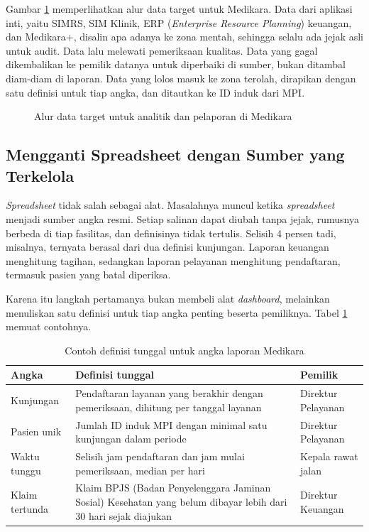 Gambar \ref{fig:ch09-alur-data-analitik} memperlihatkan alur data target
untuk Medikara. Data dari aplikasi inti, yaitu SIMRS, SIM Klinik, ERP
(\textit{Enterprise Resource Planning}) keuangan, dan Medikara+, disalin apa
adanya ke zona mentah,
sehingga selalu ada jejak asli untuk audit. Data lalu melewati pemeriksaan
kualitas. Data yang gagal dikembalikan ke pemilik datanya untuk diperbaiki di
sumber, bukan ditambal diam-diam di laporan. Data yang lolos masuk ke zona
terolah, dirapikan dengan satu definisi untuk tiap angka, dan ditautkan ke ID
induk dari MPI.

\begin{figure}[!htb]
  \centering
  
  \caption{Alur data target untuk analitik dan pelaporan di Medikara}
  \label{fig:ch09-alur-data-analitik}
\end{figure}

\subsection*{Mengganti Spreadsheet dengan Sumber yang Terkelola}

\textit{Spreadsheet} tidak salah sebagai alat. Masalahnya muncul ketika \textit{spreadsheet}
menjadi sumber angka resmi. Setiap salinan dapat diubah tanpa jejak, rumusnya
berbeda di tiap fasilitas, dan definisinya tidak tertulis. Selisih 4 persen
tadi, misalnya, ternyata berasal dari dua definisi kunjungan. Laporan keuangan
menghitung tagihan, sedangkan laporan pelayanan menghitung pendaftaran,
termasuk pasien yang batal diperiksa.

Karena itu langkah pertamanya bukan membeli alat \textit{dashboard},
melainkan menuliskan satu definisi untuk tiap angka penting beserta
pemiliknya. Tabel \ref{tab:ch09-definisi-metrik} memuat contohnya.

\begin{table}[!htb]
  \centering
  \caption{Contoh definisi tunggal untuk angka laporan Medikara}
  \label{tab:ch09-definisi-metrik}
  \small
  \begin{tabularx}{\textwidth}{lXl}
    \hline
    \textbf{Angka} & \textbf{Definisi tunggal} & \textbf{Pemilik} \\
    \hline
    Kunjungan & Pendaftaran layanan yang berakhir dengan pemeriksaan, dihitung per tanggal layanan & Direktur Pelayanan \\
    \hline
    Pasien unik & Jumlah ID induk MPI dengan minimal satu kunjungan dalam periode & Direktur Pelayanan \\
    \hline
    Waktu tunggu & Selisih jam pendaftaran dan jam mulai pemeriksaan, median per hari & Kepala rawat jalan \\
    \hline
    Klaim tertunda & Klaim BPJS (Badan Penyelenggara Jaminan Sosial) Kesehatan yang belum dibayar lebih dari 30 hari sejak diajukan & Direktur Keuangan \\
    \hline
  \end{tabularx}
\end{table}

